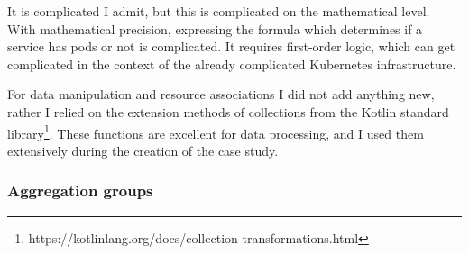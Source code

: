 It is complicated I admit, but this is complicated on the mathematical level. With mathematical precision, expressing the formula which determines if a service has pods or not is complicated. It requires first-order logic, which can get complicated in the context of the already complicated Kubernetes infrastructure.

For data manipulation and resource associations I did not add anything new, rather I relied on the extension methods of collections from the Kotlin standard library\footnote{https://kotlinlang.org/docs/collection-transformations.html}. These functions are excellent for data processing, and I used them extensively during the creation of the case study.

\subsubsection{Aggregation groups}



